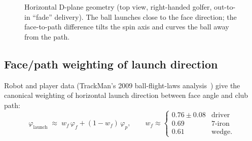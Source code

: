 \begin{figure}[htbp]
\centering
{}
\caption{Horizontal D-plane geometry (top view, right-handed golfer,
out-to-in ``fade'' delivery). The ball launches close to the face
direction; the face-to-path difference tilts the spin axis and curves the
ball away from the path.}
\label{fig:dplane}
\end{figure}

\subsection{Face/path weighting of launch direction}
\label{sec:facepathweighting}

Robot and player data (TrackMan's 2009 ball-flight-laws
analysis~\cite{trackmanballflightlaws}) give the canonical weighting of
horizontal launch direction between face angle and club path:
\begin{equation}
\label{eq:launchweight}
\varphi_{\mathrm{launch}} \;\approx\;
  w_f\,\varphi_f + (1-w_f)\,\varphi_p,
\qquad
w_f \approx
\begin{cases}
  0.76 \pm 0.08 & \text{driver} \\
  0.69 & \text{7-iron} \\
  0.61 & \text{wedge.}
\end{cases}
\end{equation}

